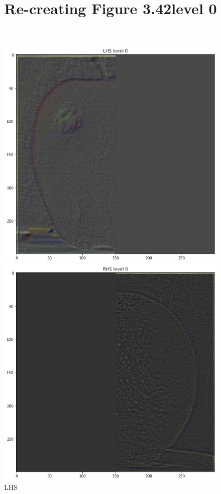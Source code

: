 \documentclass{article}
\begin{document}
\title{Re-creating Figure 3.42}
\begin{figure}[!htb]
\title{level 0}
    \includegraphics[width=\linewidth]{LHS 0.png}
    \caption{LHS}
\endminipage
{}
    \includegraphics[width=\linewidth]{RHS 0.png}

\end{figure}
\end{document}
